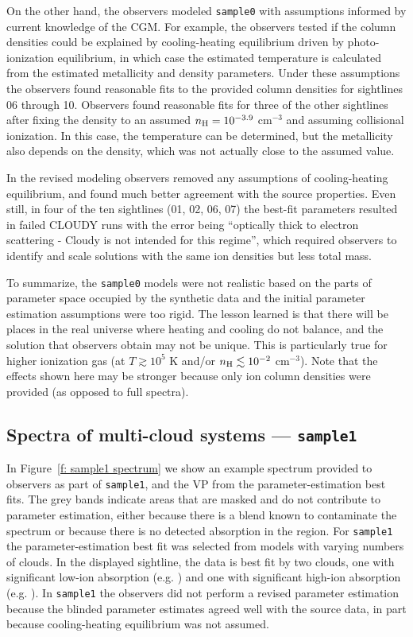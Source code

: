 \documentclass[fleqn,usenatbib]{mnras}
\begin{document}
On the other hand, the observers modeled \texttt{sample0} with assumptions informed by current knowledge of the CGM.
For example, the observers tested if the column densities could be explained by cooling-heating equilibrium driven by photo-ionization equilibrium, in which case the estimated temperature is calculated from the estimated metallicity and density parameters.
Under these assumptions the observers found reasonable fits to the provided column densities for sightlines 06 through 10.
Observers found reasonable fits for three of the other sightlines after fixing the density to an assumed $n_{\rm H} = 10^{-3.9}$ cm$^{-3}$ and assuming collisional ionization.
In this case, the temperature can be determined, but the metallicity also depends on the density,
which was not actually close to the assumed value.

In the revised modeling observers removed any assumptions of cooling-heating equilibrium, and found much better agreement with the source properties.
Even still, in four of the ten sightlines (\textsc{01}, \textsc{02}, \textsc{06}, \textsc{07}) the best-fit parameters resulted in failed CLOUDY runs with the error being ``optically thick to electron scattering - Cloudy is not intended for this regime'', which required observers to identify and scale solutions with the same ion densities but less total mass.

To summarize, the \texttt{sample0} models were not realistic based on the parts of parameter space occupied by the synthetic data and the initial parameter estimation assumptions were too rigid.
The lesson learned is that there will be places in the real universe where heating and cooling do not balance, and the solution that observers obtain may not be unique.
This is particularly true for higher ionization gas (at $T \gtrsim 10^{5}$ K and/or $n_{\rm H} \lesssim 10^{-2}$ cm$^{-3}$).
Note that the effects shown here may be stronger because only ion column densities were provided (as opposed to full spectra).

\subsection{Spectra of multi-cloud systems --- \texttt{sample1}}
\label{s: results -- sample1}

In Figure~\ref{f: sample1 spectrum} we show an example spectrum provided to observers as part of \texttt{sample1}, and the VP from the parameter-estimation best fits.
The grey bands indicate areas that are masked and do not contribute to parameter estimation,
either because there is a blend known to contaminate the spectrum or because there is no detected absorption in the region.
For \texttt{sample1} the parameter-estimation best fit was selected from models with varying numbers of clouds.
In the displayed sightline, the data is best fit by two clouds, one with significant low-ion absorption (e.g. )  and one with significant high-ion absorption (e.g. ).
In \texttt{sample1} the observers did not perform a revised parameter estimation because the blinded parameter estimates agreed well with the source data, in part because cooling-heating equilibrium was not assumed.
\end{document}
